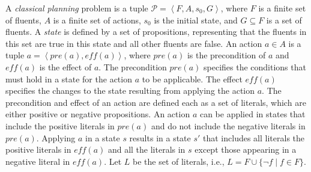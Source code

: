 \documentclass[letterpaper]{article} %
\newcommand{\pre}{\ensuremath{\textit{pre}}\xspace}
\newcommand{\eff}{\ensuremath{\textit{eff}}\xspace}
\newcommand{\tuple}[1]{\ensuremath{\left \langle #1 \right \rangle }}
\newif\ifaddcomments
\newcommand{\roni}[1]{\ifaddcomments{\textcolor{red}{[Roni: #1]}}\fi}
\newcommand{\pascalJr}[1]{\ifaddcomments{\textcolor{cyan}{[Pascal L.: {#1}]}}\fi}
\begin{document}
A \emph{classical planning} problem is a tuple $\mathcal{P} = \tuple{F, A, s_0, G}$, where $F$ is a finite set of fluents, $A$ is a finite set of actions, $s_0$ is the initial state, and $G\subseteq F$ is a set of fluents. 
A \emph{state} is defined by a set of propositions, representing that the fluents in this set are true in this state and all other fluents are false. 
An action $a\in A$ is a tuple $a = \tuple{\mathit{pre}(a), \mathit{eff}(a)}$, where $\mathit{pre}(a)$ is the precondition of $a$ and $\mathit{eff}(a)$ is the effect of $a$. 
The precondition $\mathit{pre}(a)$ specifies the conditions that must hold in a state for the action $a$ to be applicable. The effect $\mathit{eff}(a)$ specifies the changes to the state resulting from applying the action $a$.   
The precondition and effect of an action are defined each as a set of literals, which are either positive or negative propositions. 
An action $a$ can be applied in states that include the positive literals in 
$\pre(a)$ and do not include the negative literals in 
$\pre(a)$. 
Applying $a$ in a state $s$ results in a state $s'$ that includes all literals the positive literals in $\eff(a)$ and all the literals in $s$ except those appearing in a negative literal in $\eff(a)$. 
Let $L$ be the set of literals, i.e., 
$L = F \cup \{\neg f \mid f\in F\}$. 
\end{document}
